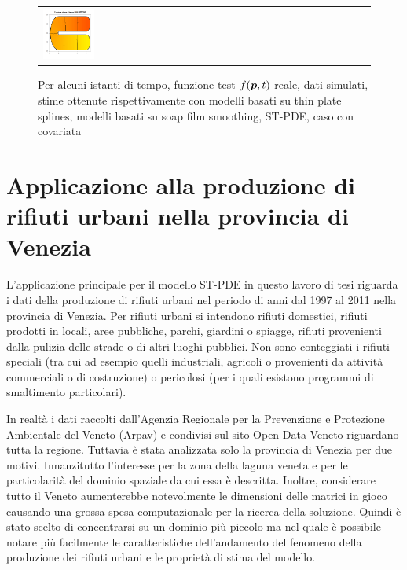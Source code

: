 \documentclass[a4paper,11pt,twoside,openright]{book}							%
\begin{document}
\begin{landscape}
\begin{figure}
\begin{tabular}{lccccc}
\includegraphics[trim=0cm 0cm 0cm 1.8cm,clip=true,width=0.19\textwidth,valign=t]{Immagini/simulazioni_covar/STSRtempo4.png}
\end{tabular}
\caption{Per alcuni istanti di tempo, funzione test $f(\protect\bm{p},t)$ reale, dati simulati, stime ottenute rispettivamente con modelli basati su thin plate splines, modelli basati su soap film smoothing, ST-PDE, caso con covariata}
\label{fig:confronto_altri_metodi_cov}
\end{figure}
\end{landscape}


\chapter{Applicazione alla produzione di rifiuti urbani nella provincia di Venezia}
\label{cap:rifiuti}

L'applicazione principale per il modello ST-PDE in questo lavoro di tesi riguarda i dati della produzione di rifiuti urbani nel periodo di anni dal 1997 al 2011 nella provincia di Venezia. Per rifiuti urbani si intendono rifiuti domestici, rifiuti prodotti in locali, aree pubbliche, parchi, giardini o spiagge, rifiuti provenienti dalla pulizia delle strade o di altri luoghi pubblici. Non sono conteggiati i rifiuti speciali (tra cui ad esempio quelli industriali, agricoli o provenienti da attività commerciali o di costruzione) o pericolosi (per i quali esistono programmi di smaltimento particolari).

In realtà i dati raccolti dall'Agenzia Regionale per la Prevenzione e Protezione Ambientale del Veneto (Arpav) e condivisi sul sito Open Data Veneto riguardano tutta la regione. Tuttavia è stata analizzata solo la provincia di Venezia per due motivi. Innanzitutto l'interesse per la zona della laguna veneta e per le particolarità del dominio spaziale da cui essa è descritta. Inoltre, considerare tutto il Veneto aumenterebbe notevolmente le dimensioni delle matrici in gioco causando una grossa spesa computazionale per la ricerca della soluzione. Quindi è stato scelto di concentrarsi su un dominio più piccolo ma nel quale è possibile notare più facilmente le caratteristiche dell'andamento del fenomeno della produzione dei rifiuti urbani e le proprietà di stima del modello.
\end{document}
